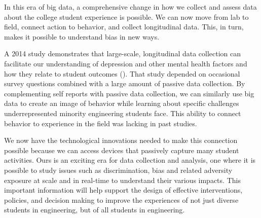 


In this era of big data, a comprehensive change in how we collect and assess data about the college student experience is possible. We can now move from lab to field, connect action to behavior, and collect longitudinal data. This, in turn, makes it possible to understand bias in  new ways.  

A 2014 study demonstrates that large-scale, longitudinal data collection can facilitate our understanding of depression and other mental health factors and how they relate to student outcomes (\eg \cite{wang2014studentlife}). That study depended on occasional survey questions combined with a large amount of passive data collection. By complementing self reports with passive data collection, we can similarly use big data to create an image of behavior while learning about specific challenges underrepresented minority engineering students face. This ability to connect behavior to experience in the field was lacking in past studies.  %

We now have the technological innovations needed to make this connection possible because we can access devices that passively capture many student activities. %
Ours is an exciting era for data collection and analysis, one where it is possible to study issues such as discrimination, bias and related adversity exposure at scale and in real-time to understand their various impacts. This important information will help support the design of effective interventions, policies, and decision making to improve the experiences of not just diverse students in engineering, but of all students in engineering. 
 
